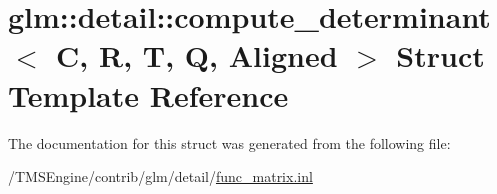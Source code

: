 \hypertarget{structglm_1_1detail_1_1compute__determinant}{}\section{glm\+:\+:detail\+:\+:compute\+\_\+determinant$<$ C, R, T, Q, Aligned $>$ Struct Template Reference}
\label{structglm_1_1detail_1_1compute__determinant}


The documentation for this struct was generated from the following file\+:\begin{DoxyCompactItemize}
\item 
/\+T\+M\+S\+Engine/contrib/glm/detail/\hyperlink{func__matrix_8inl}{func\+\_\+matrix.\+inl}\end{DoxyCompactItemize}
